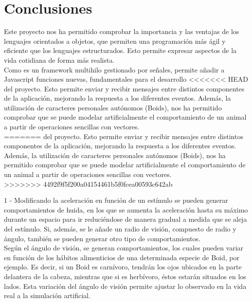 \section{Conclusiones}
\label{chap:conclusiones}

Este proyecto nos ha permitido comprobar la importancia y las ventajas de los lenguajes orientados a objetos, que permiten una programación más 
ágil y eficiente que los lenguajes estructurados. Esto permite expresar aspectos de la vida cotidiana de forma más realista.\\

Como \lluvia{} es un framework multihilo gestionado por señales, permite añadir a Javascript funciones nuevas, fundamentales para el desarrollo 
<<<<<<< HEAD
del proyecto. Esto permite enviar y recibir mensajes entre distintos componentes de la aplicación, mejorando la respuesta a los diferentes 
eventos. Además, la utilización de caracteres personales autónomos (Boids), nos ha permitido comprobar que se puede modelar artificialmente el 
comportamiento de un animal a partir de operaciones sencillas con vectores.\\
=======
del proyecto. Esto permite enviar y recibir mensajes entre distintos componentes de la aplicación, mejorando la respuesta a los diferentes eventos. 
Además, la utilización de caracteres personales autónomos (Boids), nos ha permitido comprobar que se puede modelar artificialmente el comportamiento 
de un animal a partir de operaciones sencillas con vectores.\\
>>>>>>> 4492f9f5f200a04154461b5f0fcea00593c642ab

1 - Modificando la aceleración en función de un estímulo se pueden generar comportamientos de huida, en los que se aumenta la aceleración hasta 
su máximo durante un espacio para ir reduciéndose de manera gradual a medida que se aleja del estímulo.
Si, además, se le añade un radio de visión, compuesto de radio y ángulo, también se pueden generar otro tipo de comportamientos.\\

Según el ángulo de visión, se generan comportamientos, los cuales pueden variar en función de los hábitos alimenticios de 
una determinada especie de Boid, por ejemplo. Es decir, si un Boid es carnívoro, tendrán los ojos ubicados en la parte delantera de la cabeza,
mientras que si es herbívoro, éstos estarán situados en los lados. Esta variación del ángulo de visión permite ajustar lo observado en la vida 
real a la simulación artificial.\\

